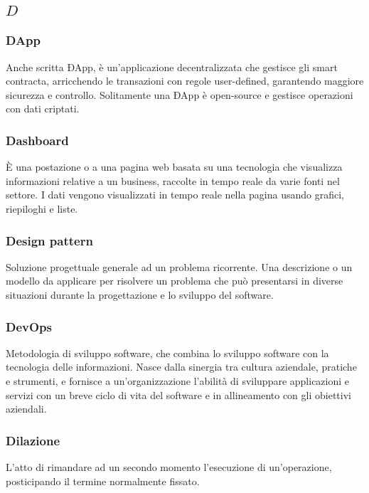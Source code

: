 \subsection*{\quad$D\quad$}
\subsubsection*{DApp}
Anche scritta ÐApp, è un'applicazione decentralizzata che gestisce gli smart contracta\glo, arricchendo le transazioni con regole user-defined, garantendo maggiore sicurezza e controllo. Solitamente una ÐApp è open-source e  gestisce operazioni con dati criptati.

\subsubsection*{Dashboard}
È una postazione o a una pagina web basata su una tecnologia che visualizza informazioni relative a un business, raccolte in tempo reale da varie fonti nel settore. I dati vengono visualizzati in tempo reale nella pagina usando grafici, riepiloghi e liste.

\subsubsection*{Design pattern}
Soluzione progettuale generale ad un problema ricorrente. Una descrizione o un modello da applicare per risolvere un problema che può presentarsi in diverse situazioni durante la progettazione e lo sviluppo del software.

\subsubsection*{DevOps}
Metodologia di sviluppo software, che combina lo sviluppo software con la tecnologia delle informazioni. Nasce dalla sinergia tra cultura aziendale, pratiche e strumenti, e fornisce a un'organizzazione l'abilità di sviluppare applicazioni e servizi con un breve ciclo di vita del software e in allineamento con gli obiettivi aziendali.

\subsubsection*{Dilazione}
L'atto di rimandare ad un secondo momento l'esecuzione di un'operazione, posticipando il termine normalmente fissato.

